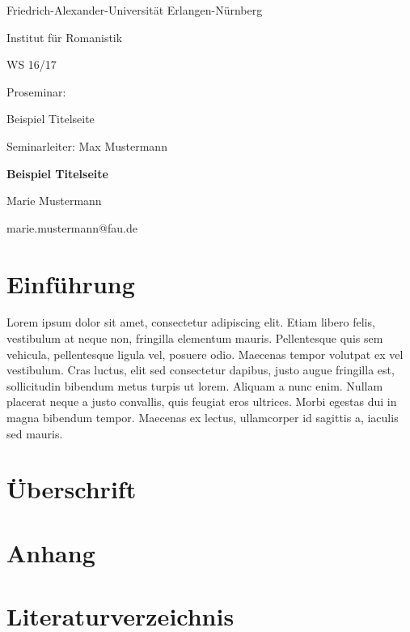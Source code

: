 \documentclass[12pt, a4paper]{article}
\begin{document}
\nocite{*} %

\begin{titlepage}
  \begin{center}
    Friedrich-Alexander-Universität Erlangen-Nürnberg

    Institut für Romanistik

    WS 16/17

    \vspace{1cm}
    Proseminar:

    Beispiel Titelseite

    Seminarleiter: Max Mustermann
    \vspace{3cm}

    \Large \textbf{Beispiel Titelseite}

    \vspace{1cm}
    \small{Marie Mustermann}

    \small{marie.mustermann@fau.de}
    \vspace{1cm}
  \end{center}
\end{titlepage}

\tableofcontents
\thispagestyle{empty}
\pagestyle{empty}



\onehalfspacing

\section{Einführung}
Lorem ipsum dolor sit amet, consectetur adipiscing elit. Etiam libero felis, vestibulum at neque non, fringilla elementum mauris. Pellentesque quis sem vehicula, pellentesque ligula vel, posuere odio. Maecenas tempor volutpat ex vel vestibulum. Cras luctus, elit sed consectetur dapibus, justo augue fringilla est, sollicitudin bibendum metus turpis ut lorem. Aliquam a nunc enim. Nullam placerat neque a justo convallis, quis feugiat eros ultrices. Morbi egestas dui in magna bibendum tempor. Maecenas ex lectus, ullamcorper id sagittis a, iaculis sed mauris.

\section{Überschrift}

\section{Anhang}



\section*{Literaturverzeichnis}
\renewcommand{\section}[2]{} %



\end{document}
